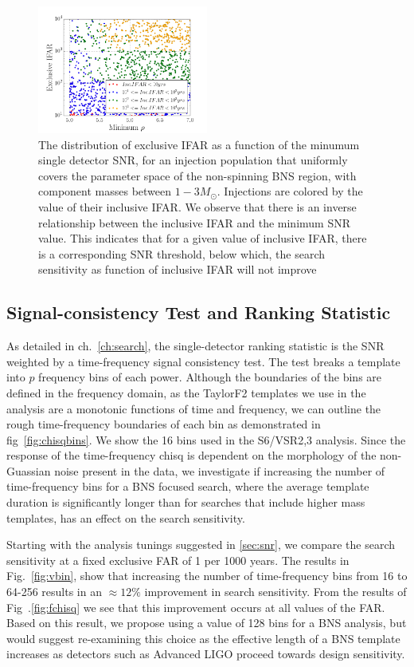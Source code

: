 \begin{figure}
\centering
\includegraphics[width=0.5\textwidth]{papers/bns_o1_dev/figures/ifarifar.png}
\caption{\label{fig:ifarifar} 
The distribution of exclusive IFAR as a function of the minumum single detector SNR, for an injection population that uniformly covers the parameter space of the non-spinning BNS region, with component masses between $1- 3M_\odot$. Injections are colored by the value of their inclusive IFAR. We observe that there is an inverse relationship between the inclusive IFAR and the minimum SNR value. This indicates that for a given value of inclusive IFAR, there is a corresponding SNR threshold, below which, the search sensitivity as function of inclusive IFAR will not improve
}
\end{figure}


\subsection{Signal-consistency Test and Ranking Statistic}
\label{sec:chisq}

As detailed in ch.~\ref{ch:search}, the single-detector ranking statistic is the SNR weighted by a time-frequency signal consistency test. The test breaks a template into $p$  frequency bins of each power. Although the boundaries of the bins are defined in the frequency domain, as the TaylorF2 templates we use in the analysis are a monotonic functions of time and frequency, we can outline the rough time-frequency boundaries of each bin as demonstrated in fig~\ref{fig:chisqbins}. We show the 16 bins used in the S6/VSR2,3 analysis. Since the response of the time-frequency chisq is dependent on the morphology of the non-Guassian noise present in the data, we investigate if increasing the number of time-frequency bins for a BNS focused search, where the average template duration is significantly longer than for searches that include higher mass templates, has an effect on the search sensitivity.

Starting with the analysis tunings suggested in \ref{sec:snr}, we compare the search sensitivity at a fixed exclusive FAR of 1 per 1000 years. The results in Fig.~\ref{fig:vbin}, show that increasing the number of time-frequency bins from 16 to 64-256 results in an $\approx 12\%$ improvement in search sensitivity. From the results of Fig~.\ref{fig:fchisq} we see  that this improvement occurs at all values of the FAR. Based on this result, we propose using a value of 128 bins for a BNS analysis, but would suggest re-examining this choice as the effective length of a BNS template increases as detectors such as Advanced LIGO proceed towards design sensitivity.

